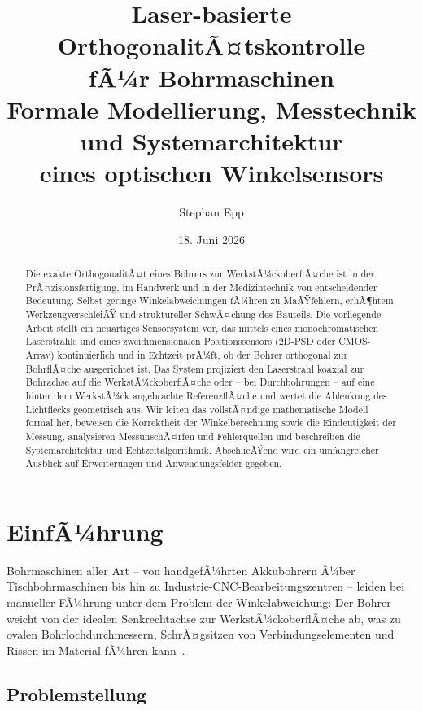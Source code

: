 ﻿\documentclass[a4paper,12pt]{article}
\title{\textbf{Laser-basierte OrthogonalitÃ¤tskontrolle\\fÃ¼r Bohrmaschinen}\\[0.5em]
\large Formale Modellierung, Messtechnik und Systemarchitektur\\
eines optischen Winkelsensors}
\author{Stephan Epp}
\date{18. Juni 2026}
\theoremstyle{definition}
\begin{document}
\maketitle

\begin{abstract}
Die exakte OrthogonalitÃ¤t eines Bohrers zur WerkstÃ¼ckoberflÃ¤che ist in der PrÃ¤zisionsfertigung,
im Handwerk und in der Medizintechnik von entscheidender Bedeutung. Selbst geringe Winkelabweichungen
fÃ¼hren zu MaÃŸfehlern, erhÃ¶htem WerkzeugverschleiÃŸ und struktureller SchwÃ¤chung des Bauteils.
Die vorliegende Arbeit stellt ein neuartiges Sensorsystem vor, das mittels eines monochromatischen
Laserstrahls und eines zweidimensionalen Positionssensors (2D-PSD oder CMOS-Array) kontinuierlich
und in Echtzeit prÃ¼ft, ob der Bohrer orthogonal zur BohrflÃ¤che ausgerichtet ist.
Das System projiziert den Laserstrahl koaxial zur Bohrachse auf die WerkstÃ¼ckoberflÃ¤che oder --
bei Durchbohrungen -- auf eine hinter dem WerkstÃ¼ck angebrachte ReferenzflÃ¤che und wertet die
Ablenkung des Lichtflecks geometrisch aus.
Wir leiten das vollstÃ¤ndige mathematische Modell formal her, beweisen die Korrektheit
der Winkelberechnung sowie die Eindeutigkeit der Messung, analysieren MessunschÃ¤rfen
und Fehlerquellen und beschreiben die Systemarchitektur und Echtzeitalgorithmik.
AbschlieÃŸend wird ein umfangreicher Ausblick auf Erweiterungen und Anwendungsfelder gegeben.
\end{abstract}

\tableofcontents
\newpage

\section{EinfÃ¼hrung}

Bohrmaschinen aller Art -- von handgefÃ¼hrten Akkubohrern Ã¼ber Tischbohrmaschinen bis hin zu
Industrie-CNC-Bearbeitungszentren -- leiden bei manueller FÃ¼hrung unter dem Problem der
Winkelabweichung: Der Bohrer weicht von der idealen Senkrechtachse zur WerkstÃ¼ckoberflÃ¤che ab,
was zu ovalen Bohrlochdurchmessern, SchrÃ¤gsitzen von Verbindungselementen und Rissen im Material
fÃ¼hren kann~\cite{klocke2018fertigungsverfahren, toennis2020messtechnik}.

\subsection{Problemstellung}
\end{document}
